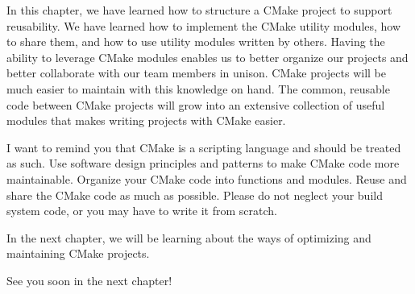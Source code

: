 In this chapter, we have learned how to structure a CMake project to support reusability. We have learned how to implement the CMake utility modules, how to share them, and how to use utility modules written by others. Having the ability to leverage CMake modules enables us to better organize our projects and better collaborate with our team members in unison. CMake projects will be much easier to maintain with this knowledge on hand. The common, reusable code between CMake projects will grow into an extensive collection of useful modules that makes writing projects with CMake easier.

I want to remind you that CMake is a scripting language and should be treated as such. Use software design principles and patterns to make CMake code more maintainable. Organize your CMake code into functions and modules. Reuse and share the CMake code as much as possible. Please do not neglect your build system code, or you may have to write it from scratch.

In the next chapter, we will be learning about the ways of optimizing and maintaining CMake projects. 

See you soon in the next chapter!
